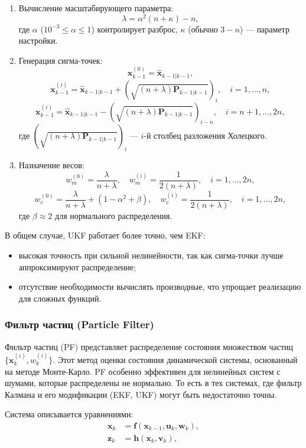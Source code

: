 \begin{enumerate}
    \item Вычисление масштабирующего параметра:
    \[
    \lambda = \alpha^2 (n + \kappa) - n,
    \]
    где \(\alpha\) (\(10^{-3} \leq \alpha \leq 1\)) контролирует разброс, \(\kappa\) (обычно \(3 - n\)) --- параметр настройки.
    \item Генерация сигма-точек:
    \[
    \mathbf{x}_{k-1}^{(0)} = \hat{\mathbf{x}}_{k-1|k-1},
    \]
    \[
    \mathbf{x}_{k-1}^{(i)} = \hat{\mathbf{x}}_{k-1|k-1} + (\sqrt{(n + \lambda) \mathbf{P}_{k-1|k-1}})_i, \quad i = 1, \dots, n,
    \]
    \[
    \mathbf{x}_{k-1}^{(i)} = \hat{\mathbf{x}}_{k-1|k-1} - (\sqrt{(n + \lambda) \mathbf{P}_{k-1|k-1}})_{i-n}, \quad i = n+1, \dots, 2n,
    \]
    где \((\sqrt{(n + \lambda) \mathbf{P}_{k-1|k-1}})_i\) --- \(i\)-й столбец разложения Холецкого.
    \item Назначение весов:
    \[
    w_m^{(0)} = \frac{\lambda}{n + \lambda}, \quad w_m^{(i)} = \frac{1}{2(n + \lambda)}, \quad i = 1, \dots, 2n,
    \]
    \[
    w_c^{(0)} = \frac{\lambda}{n + \lambda} + (1 - \alpha^2 + \beta), \quad w_c^{(i)} = \frac{1}{2(n + \lambda)}, \quad i = 1, \dots, 2n,
    \]
    где \(\beta \approx 2\) для нормального распределения.
\end{enumerate}

В общем случае, UKF работает более точно, чем EKF:
\begin{itemize}
    \item высокая точность при сильной нелинейности, так как сигма-точки лучше аппроксимируют распределение;
    \item отсутствие необходимости вычислять производные, что упрощает реализацию для сложных функций.
\end{itemize}

\subsubsection{Фильтр частиц (Particle Filter)}
\label{particle_filter}
\hfill

Фильтр частиц (PF) представляет распределение состояния множеством частиц \(\{\mathbf{x}_k^{(i)}, w_k^{(i)}\}\). 
Этот метод оценки состояния динамической системы, основанный на методе Монте-Карло.
PF особенно эффективен для нелинейных систем с шумами, которые распределены не нормально.
То есть в тех системах, где фильтр Калмана и его модификации (EKF, UKF) могут быть недостаточно точны.

Система описывается уравнениями:
\begin{align}
    \mathbf{x}_k &= \mathbf{f}(\mathbf{x}_{k-1}, \mathbf{u}_k, \mathbf{w}_k), \label{eq:pf_state} \\
    \mathbf{z}_k &= \mathbf{h}(\mathbf{x}_k, \mathbf{v}_k), \label{eq:pf_meas}
\end{align}

